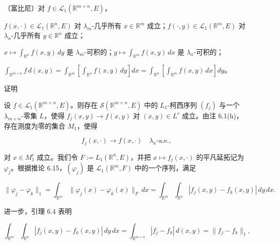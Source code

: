 \begin{theorem}

（富比尼）对 $ f \in \mathcal{L}_1(\mathbb{R}^{m+n},E) $，

\begin{subitems}
\item

$ f(x,\cdot) \in \mathcal{L}_1(\mathbb{R}^n,E) $ 对 $ \lambda_m $-几乎所有 $ x \in \mathbb{R}^m $ 成立；$ f(\cdot,y) \in \mathcal{L}_1(\mathbb{R}^m,E) $ 对 $ \lambda_n $-几乎所有 $ y \in \mathbb{R}^n $ 成立；

\item

$ x \mapsto \int_{\mathbb{R}^n} f(x,y)\,dy $ 是 $ \lambda_m $-可积的；$ y \mapsto \int_{\mathbb{R}^m} f(x,y)\,dx $ 是 $ \lambda_n $-可积的；

\item

$ \int_{\mathbb{R}^{m+n}} f\,d(x,y) = \int_{\mathbb{R}^m}\left[\int_{\mathbb{R}^n} f(x,y)\,dy\right]dx = \int_{\mathbb{R}^n}\left[\int_{\mathbb{R}^m} f(x,y)\,dx\right]dy $。

\end{subitems}

证明

\begin{items}
\item

设 $ f \in \mathcal{L}_1(\mathbb{R}^{m+n},E) $。则存在 $ \mathcal{S}(\mathbb{R}^{m+n},E) $ 中的 $ L_1 $-柯西序列 $ (f_j) $ 与一个 $ \lambda_{m+n} $-零集 $ L $，使得 $ f_j(x,y) \to f(x,y) $ 对 $ (x,y) \in L^c $ 成立。由注 6.1(h)，存在测度为零的集合 $ M_1 $，使得

\begin{equation}
f_j(x,\cdot) \to f(x,\cdot) \quad \lambda_n\text{-a.e.} ,\tag{6.13}
\end{equation}

对 $ x \in M_1^c $ 成立。我们令 $ F := L_1(\mathbb{R}^n,E) $，并把 $ x \mapsto f_j(x,\cdot) $ 的平凡延拓记为 $ \varphi_j $。根据推论 6.15，$ (\varphi_j) $ 是 $ \mathcal{L}_1(\mathbb{R}^m,F) $ 中的一个序列，满足

\[
\|\varphi_j - \varphi_k\|_1 = \int_{\mathbb{R}^m}\|\varphi_j(x) - \varphi_k(x)\|_F\,dx = \int_{\mathbb{R}^m}\int_{\mathbb{R}^n}|f_j(x,y) - f_k(x,y)|\,dy\,dx .
\]

进一步，引理 6.4 表明

\[
\int_{\mathbb{R}^m}\int_{\mathbb{R}^n}|f_j(x,y) - f_k(x,y)|\,dy\,dx = \int_{\mathbb{R}^{m+n}}|f_j - f_k|\,d(x,y) = \|f_j - f_k\|_1 ,
\]


\end{items}
\end{theorem}
